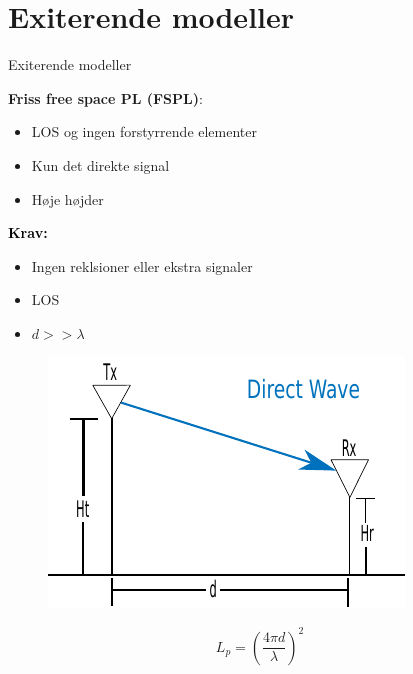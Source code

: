 \section{Exiterende modeller}
\begin{frame}{Exiterende modeller}
\begin{minipage}{.45\textwidth}
\raggedright\textcolor{thomasblue}{\textbf{Friss free space PL (FSPL)}:}
\begin{itemize}
\item LOS og ingen forstyrrende elementer
\item Kun det direkte signal
\item Høje højder
\end{itemize} 

\vspace{1em}
\textcolor{black}{\textbf{Krav:}}
\begin{itemize}
\item Ingen reklsioner eller ekstra signaler
\item LOS
\item $d >> \lambda$
\end{itemize}
\end{minipage}
\begin{minipage}{0.5\textwidth}

\begin{figure}[!htbp]
 \centering
  \includegraphics[width = \columnwidth]{figures/friss_illu.pdf}
  \end{figure}
\end{minipage}

\vspace{1em}
\begin{equation*}
L_p=\left(\frac{4 \pi d}{\lambda}\right)^2
\end{equation*}
\end{frame}


